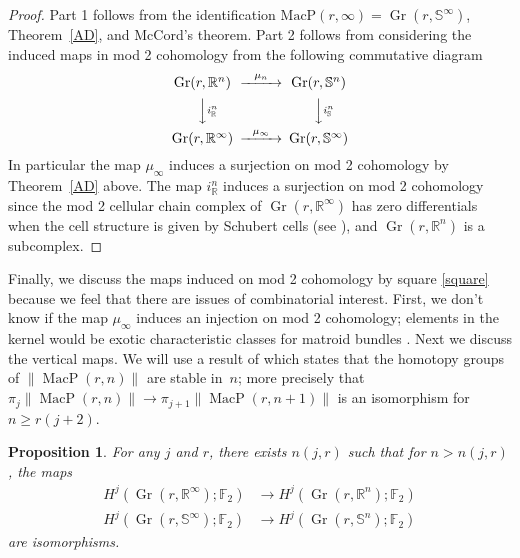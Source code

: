 \documentclass[10pt, preprint]{article}
\newtheorem{proposition}[theorem]{Proposition}
\theoremstyle{definition}
\begin{document}
\begin{proof}
Part 1 follows from the identification $\mathrm{MacP}(r,\infty ) =
\operatorname{Gr}(r,\mathbb{S}^{\infty })$, Theorem~\ref{AD}, and
McCord's theorem. Part 2 follows from considering the induced maps in
mod 2 cohomology from the following commutative diagram
%
\begin{equation}
%
\begin{CD}
\label{square}
\operatorname{Gr}(r,\mathbb{R}^{n}) @>\mu _{n}>> \operatorname{Gr}(r,
\mathbb{S}^{n})
\\
@VVi^{n}_{\mathbb{R}}V @VVi^{n}_{\mathbb{S}}V
\\
\operatorname{Gr}(r,\mathbb{R}^{\infty }) @>\mu _{\infty } >>
\operatorname{Gr}(r,\mathbb{S}^{\infty })
\end{CD}
%
\end{equation}
%
In particular the map $\mu _{\infty }$ induces a surjection on mod 2
cohomology by Theorem~\ref{AD} above. The map $i^{n}_{\mathbb{R}}$
induces a surjection on mod 2 cohomology since the mod 2 cellular chain
complex of $\operatorname{Gr}(r,\mathbb{R}^{\infty })$ has zero
differentials when the cell structure is given by Schubert cells (see
\cite{Milnor-Stasheff}), and $ \operatorname{Gr}(r,\mathbb{R}
^{n})$ is a subcomplex.
\end{proof}

Finally, we discuss the maps induced on mod 2 cohomology by square \eqref{square} because we feel that there are issues of combinatorial
interest. First, we don't know if the map $\mu _{\infty }$ induces an
injection on mod 2 cohomology; elements in the kernel would be exotic
characteristic classes for matroid bundles
\cite{Anderson-Davis}. Next we discuss the vertical maps. We will use
a result of \cite{Anderson:homotopy} which states that the
homotopy groups of $\|\operatorname{MacP}(r,n)\|$ are stable in~$n$;
more precisely that $\pi _{j}\| \operatorname{MacP}(r, n) \| \to \pi
_{j+1}\| \operatorname{MacP}(r, n+1)\|$ is an isomorphism for
$n \geq r(j+2)$.

\begin{proposition}
For any $j$ and $r$, there exists $n(j,r)$ such that for $n > n(j,r)$, the maps
%
\begin{align*}
H^{j}(\operatorname{Gr}(r,\mathbb{R}^{\infty });\mathbb{F}_{2})
&
\to H^{j}(\operatorname{Gr}(r,\mathbb{R}^{n});\mathbb{F}_{2})
\\
H^{j}(\operatorname{Gr}(r,\mathbb{S}^{\infty });\mathbb{F}_{2})
&
\to H^{j}(\operatorname{Gr}(r,\mathbb{S}^{n});\mathbb{F}_{2})
\end{align*}
%
are isomorphisms.
\end{proposition}
\end{document}
